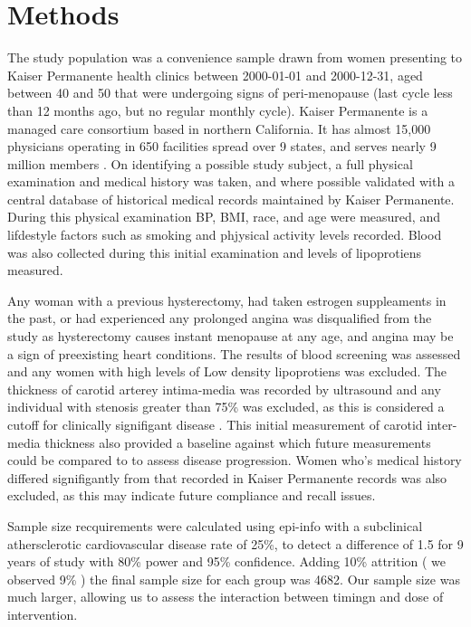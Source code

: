 \documentclass[11pt]{article}
\begin{document}
		\newpage
	\section{Methods} 
		The study population was a convenience sample drawn from women presenting to Kaiser Permanente health clinics between 2000-01-01 and 2000-12-31, aged between 40 and 50 that were undergoing signs of peri-menopause (last cycle less than 12 months ago, but no regular monthly cycle).
		Kaiser Permanente is a managed care consortium based in northern California. It has almost 15,000 physicians operating in 650 facilities spread over 9 states, and serves nearly 9 million members \cite{Rauber}.
		On identifying a possible study subject, a full physical examination and medical history was taken, and where possible validated with a central database of historical medical records maintained by Kaiser Permanente.
		During this physical examination BP, BMI, race, and age were measured, and lifdestyle factors such as smoking and phjysical activity levels recorded.
		Blood was also collected during this initial examination and levels of lipoprotiens measured.


		Any woman with a previous hysterectomy, had taken estrogen suppleaments in the past, or had experienced any prolonged angina was disqualified from the study as hysterectomy causes instant menopause at any age, and angina may be a sign of preexisting heart conditions.
		The results of blood screening was assessed and any women with high levels of Low density lipoprotiens was excluded.
		The thickness of carotid arterey intima-media was recorded  by ultrasound and any individual with stenosis greater than 75\% was excluded, as this is considered a cutoff for clinically signifigant disease \cite{Maseri2003}. 
		This initial measurement of carotid inter-media thickness also provided a baseline against which future measurements could be compared to to assess disease progression.
		Women who's medical history differed signifigantly from that recorded in Kaiser Permanente records was also excluded, as this may indicate future compliance and recall issues.
		

		Sample size recquirements were calculated using epi-info with a subclinical athersclerotic cardiovascular disease rate of 25\%, to detect a difference of 1.5 for 9 years of study with 80\% power and 95\% confidence.
		Adding 10\% attrition ( we observed 9\% ) the final sample size for each group was 4682. 
		Our sample size was much larger, allowing us to assess the interaction between timingn and dose of intervention.
\end{document}
